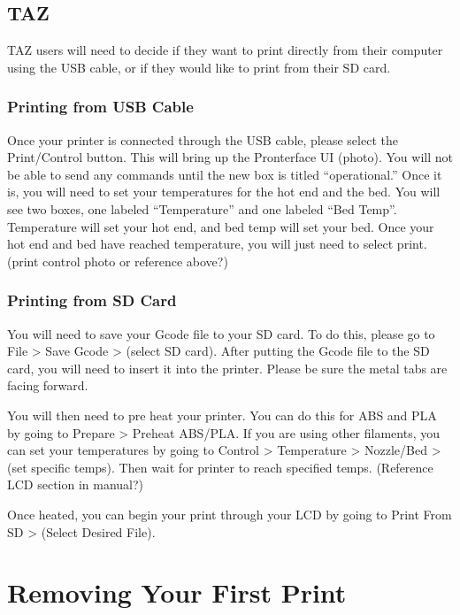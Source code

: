 \subsection{TAZ}

TAZ users will need to decide if they want to print directly from their computer using the USB cable, or if they would like to print from their SD card. 

\subsubsection{Printing from USB Cable}

Once your printer is connected through the USB cable, please select the Print/Control button. This will bring up the Pronterface UI (photo). You will not be able to send any commands until the new box is titled “operational.” Once it is, you will need to set your temperatures for the hot end and the bed. You will see two boxes, one labeled “Temperature” and one labeled “Bed Temp”. Temperature will set your hot end, and bed temp will set your bed. Once your hot end and bed have reached temperature, you will just need to select print. (print control photo or reference above?)

\subsubsection{Printing from SD Card}

You will need to save your Gcode file to your SD card. To do this, please go to File > Save Gcode > (select SD card). After putting the Gcode file to the SD card, you will need to insert it into the printer. Please be sure the metal tabs are facing forward. 

You will then need to pre heat your printer. You can do this for ABS and PLA by going to Prepare > Preheat ABS/PLA. If you are using other filaments, you can set your temperatures by going to Control > Temperature > Nozzle/Bed > (set specific temps). Then wait for printer to reach specified temps. (Reference LCD section in manual?)

Once heated, you can begin your print through your LCD by going to Print From SD > (Select Desired File).

\section{Removing Your First Print}

